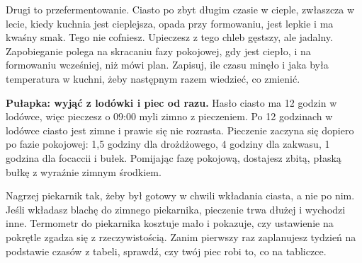 Drugi to przefermentowanie. Ciasto po zbyt długim czasie w cieple, zwłaszcza w lecie, kiedy kuchnia jest cieplejsza, opada przy formowaniu, jest lepkie i ma kwaśny smak. Tego nie cofniesz. Upieczesz z tego chleb gęstszy, ale jadalny. Zapobieganie polega na skracaniu fazy pokojowej, gdy jest ciepło, i na formowaniu wcześniej, niż mówi plan. Zapisuj, ile czasu minęło i jaka była temperatura w kuchni, żeby następnym razem wiedzieć, co zmienić.

\begin{falle}
\textbf{Pułapka: wyjąć z lodówki i piec od razu.} Hasło \glqq ciasto ma 12 godzin w lodówce, więc pieczesz o 09:00\grqq{} myli zimno z pieczeniem. Po 12 godzinach w lodówce ciasto jest zimne i prawie się nie rozrasta. Pieczenie zaczyna się dopiero po fazie pokojowej: 1,5 godziny dla drożdżowego, 4 godziny dla zakwasu, 1 godzina dla focaccii i bułek. Pomijając fazę pokojową, dostajesz zbitą, płaską bułkę z wyraźnie zimnym środkiem.
\end{falle}

\begin{piekarnik}
Nagrzej piekarnik tak, żeby był gotowy w chwili wkładania ciasta, a nie po nim. Jeśli wkładasz blachę do zimnego piekarnika, pieczenie trwa dłużej i wychodzi inne. Termometr do piekarnika kosztuje mało i pokazuje, czy ustawienie na pokrętle zgadza się z rzeczywistością. Zanim pierwszy raz zaplanujesz tydzień na podstawie czasów z tabeli, sprawdź, czy twój piec robi to, co na tabliczce.
\end{piekarnik}


